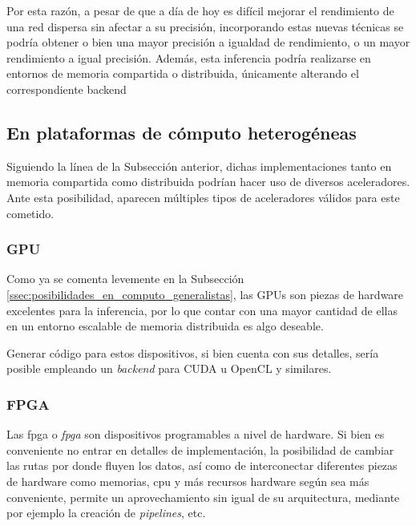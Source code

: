 Por esta razón, a pesar de que a día de hoy es difícil mejorar el rendimiento de una red dispersa sin afectar a su precisión, incorporando estas nuevas técnicas se podría obtener o bien una mayor precisión a igualdad de rendimiento, o un mayor rendimiento a igual precisión. Además, esta inferencia podría realizarse en entornos de memoria compartida o distribuida, únicamente alterando el correspondiente \gls{backend} 






\subsection{En plataformas de cómputo heterogéneas}
\label{ssec:posibilidades_en_computo_heterogeneas}
Siguiendo la línea de la Subsección anterior, dichas implementaciones tanto en memoria compartida como distribuida podrían hacer uso de diversos aceleradores. Ante esta posibilidad, aparecen múltiples tipos de aceleradores válidos para este cometido.

\subsubsection{GPU}
\label{sssec:heterogeneas_gpu}
Como ya se comenta levemente en la Subsección \ref{ssec:posibilidades_en_computo_generalistas}, las GPUs son piezas de hardware excelentes para la inferencia, por lo que contar con una mayor cantidad de ellas en un entorno escalable de memoria distribuida es algo deseable.

Generar código para estos dispositivos, si bien cuenta con sus detalles, sería posible empleando un \textit{backend} para CUDA u OpenCL y similares.

\subsubsection{FPGA}
\label{sssec:heterogeneas_fpga}
Las \acrshort{fpga} o \textit{\acrlong{fpga}} son dispositivos programables a nivel de hardware. Si bien es conveniente no entrar en detalles de implementación, la posibilidad de cambiar las rutas por donde fluyen los datos, así como de interconectar diferentes piezas de hardware como memorias, \acrshort{cpu} y más recursos hardware según sea más conveniente, permite un aprovechamiento sin igual de su arquitectura, mediante por ejemplo la creación de \textit{pipelines}, etc.

